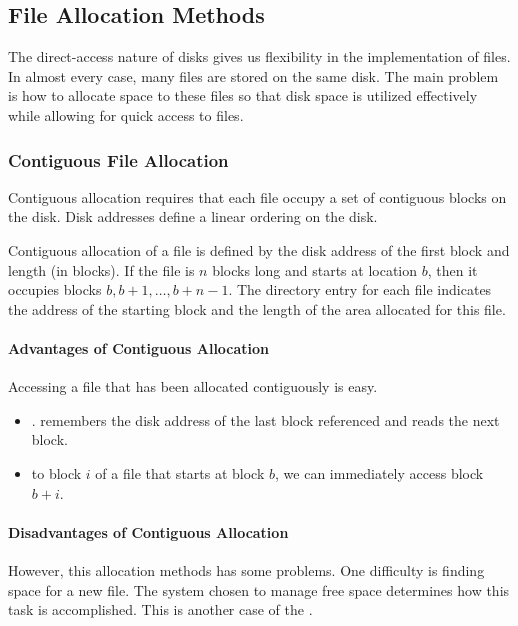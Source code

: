 \subsection{File Allocation Methods}\label{subsec:File_Allocation_Methods}
The direct-access nature of disks gives us flexibility in the implementation of files.
In almost every case, many files are stored on the same disk.
The main problem is how to allocate space to these files so that disk space is utilized effectively while allowing for quick access to files.

\subsubsection{Contiguous File Allocation}\label{subsubsec:Contiguous_File_Allocation}
Contiguous allocation requires that each file occupy a set of contiguous blocks on the disk.
Disk addresses define a linear ordering on the disk.

Contiguous allocation of a file is defined by the disk address of the first block and length (in blocks).
If the file is $n$ blocks long and starts at location $b$, then it occupies blocks $b, b+1, \ldots, b+n-1$.
The directory entry for each file indicates the address of the starting block and the length of the area allocated for this file.

\paragraph{Advantages of Contiguous Allocation}\label{par:Contiguous_File_Allocation_Advantages}
Accessing a file that has been allocated contiguously is easy.
\begin{itemize}[noitemsep]
\item \textbf{}.
   remembers the disk address of the last block referenced and reads the next block.
\item \textbf{} to block $i$ of a file that starts at block $b$, we can immediately access block $b + i$.
\end{itemize}

\paragraph{Disadvantages of Contiguous Allocation}\label{par:Contiguous_File_Allocation_Disadvantages}
However, this allocation methods has some problems.
One difficulty is finding space for a new file.
The system chosen to manage free space determines how this task is accomplished.
This is another case of the .

